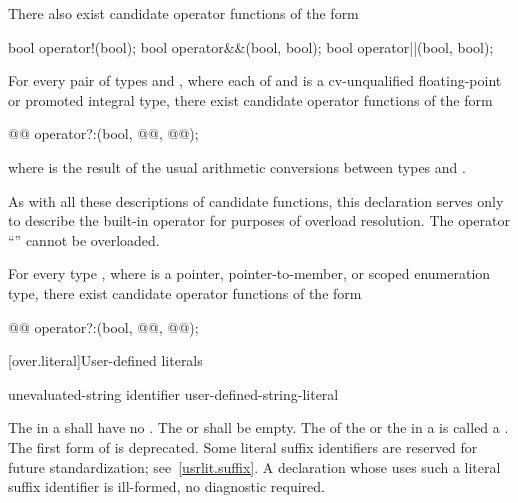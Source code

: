 \pnum
There also exist candidate operator functions of the form
\begin{codeblock}
bool    operator!(bool);
bool    operator&&(bool, bool);
bool    operator||(bool, bool);
\end{codeblock}

\pnum
For every pair of types  and ,
where each of  and  is a
cv-unqualified floating-point or promoted integral type,
there exist candidate operator functions of the form
\begin{codeblock}
@@      operator?:(bool, @@, @@);
\end{codeblock}
where
is the result of the usual arithmetic conversions between types
and
.
\begin{note}
As with all these descriptions of candidate functions, this declaration serves
only to describe the built-in operator for purposes of overload resolution.
The operator
``''
cannot be overloaded.
\end{note}

\pnum
For every type
,
where
is a pointer, pointer-to-member, or scoped enumeration type, there exist candidate operator
functions of the form
\begin{codeblock}
@@       operator?:(bool, @@, @@);
\end{codeblock}%

[over.literal]{User-defined literals}%
%

\begin{bnf}
\br
     unevaluated-string identifier\br
     user-defined-string-literal
\end{bnf}

\pnum
The 
in a 
shall have no .
The  or
 shall be empty.
The  of the  or
the  in a  is called a
.
The first form of  is deprecated.
Some literal suffix identifiers are reserved for future standardization;
see~\ref{usrlit.suffix}.  A declaration whose  uses
such a literal suffix identifier is ill-formed, no diagnostic required.


